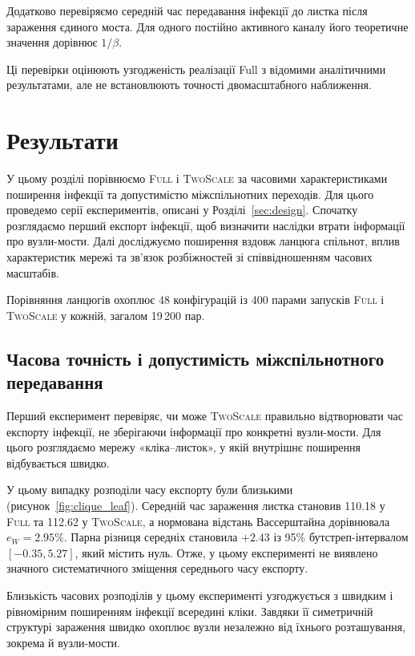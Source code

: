 \documentclass[a4paper,fleqn]{cas-sc}
\newcommand{\Full}{\textup{\textsc{Full}}}
\newcommand{\TS}{\textup{\textsc{TwoScale}}}
\newcommand{\eW}{e_{W}}
\begin{document}
Додатково перевіряємо середній час
передавання інфекції до листка
після зараження єдиного моста.
Для одного постійно активного каналу
його теоретичне значення дорівнює $1/\beta$.

Ці перевірки оцінюють узгодженість
реалізації Full з відомими аналітичними
результатами, але не встановлюють
точності двомасштабного наближення.









\section{Результати}
\label{sec:results}

У цьому розділі порівнюємо \Full{} і \TS{}
за часовими характеристиками поширення інфекції
та допустимістю міжспільнотних переходів.
Для цього проведемо серії експериментів, описані у Розділі~\ref{sec:design}.
Спочатку розглядаємо перший експорт інфекції,
щоб визначити наслідки втрати інформації
про вузли-мости. Далі досліджуємо поширення
вздовж ланцюга спільнот, вплив характеристик
мережі та зв'язок розбіжностей зі співвідношенням
часових масштабів.

Порівняння ланцюгів охоплює 48 конфігурацій
із 400 парами запусків \Full{} і \TS{} у кожній,
загалом 19\,200 пар.


\subsection{Часова точність і допустимість
міжспільнотного передавання}
\label{sec:res_clique}

Перший експеримент перевіряє, чи може \TS{}
правильно відтворювати час експорту інфекції,
не зберігаючи інформації про конкретні
вузли-мости. Для цього розглядаємо мережу
«кліка--листок», у якій внутрішнє поширення
відбувається швидко.

У цьому випадку розподіли часу експорту
були близькими (рисунок~\ref{fig:clique_leaf}).
Середній час зараження листка становив
110.18 у \Full{} та 112.62 у \TS{},
а нормована відстань Вассерштайна
дорівнювала $\eW=2.95\%$.
Парна різниця середніх становила $+2.43$
із 95\% бутстреп-інтервалом $[-0.35,5.27]$,
який містить нуль. Отже, у цьому експерименті
не виявлено значного систематичного
зміщення середнього часу експорту.

Близькість часових розподілів у цьому
експерименті узгоджується з швидким
і рівномірним поширенням інфекції
всередині кліки. Завдяки її симетричній
структурі зараження швидко охоплює
вузли незалежно від їхнього розташування,
зокрема й вузли-мости.
\end{document}
